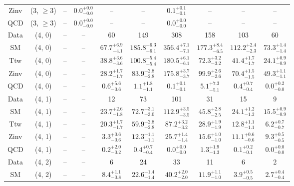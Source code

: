 \begin{table}[h!]
{\begin{tabular}{cccccccccc}
	Zinv & (3, $\ge3$) & -- & $0.0^{+ 0.0 }_{- 0.0 }$ & -- & -- & $0.1^{+ 0.1 }_{- 0.1 }$ & -- & -- & -- \\[0.5ex] 
	QCD & (3, $\ge3$) & -- & $0.0^{+ 0.0 }_{- 0.0 }$ & -- & -- & $0.0^{+ 0.0 }_{- 0.0 }$ & -- & -- & -- \\[0.5ex] 
	Data & (4, 0) & -- & -- & 60 & 149 & 308 & 158 & 103 & 60 \\[0.5ex] 
	SM & (4, 0) & -- & -- & $67.7^{+ 6.9 }_{- 4.1 }$ & $185.8^{+ 6.3 }_{- 6.1 }$ & $356.4^{+ 7.1 }_{- 7.1 }$ & $177.3^{+ 8.4 }_{- 6.5 }$ & $112.2^{+ 2.4 }_{- 2.3 }$ & $73.3^{+ 1.4 }_{- 1.4 }$ \\[0.5ex] 
	Ttw & (4, 0) & -- & -- & $38.8^{+ 3.6 }_{- 3.6 }$ & $100.8^{+ 5.4 }_{- 5.4 }$ & $180.5^{+ 6.1 }_{- 6.1 }$ & $72.3^{+ 3.2 }_{- 3.2 }$ & $41.4^{+ 1.7 }_{- 1.7 }$ & $24.1^{+ 0.9 }_{- 0.9 }$ \\[0.5ex] 
	Zinv & (4, 0) & -- & -- & $28.2^{+ 1.7 }_{- 1.7 }$ & $83.9^{+ 2.8 }_{- 2.8 }$ & $175.8^{+ 3.7 }_{- 3.7 }$ & $99.9^{+ 2.6 }_{- 2.6 }$ & $70.4^{+ 1.5 }_{- 1.5 }$ & $49.3^{+ 1.1 }_{- 1.1 }$ \\[0.5ex] 
	QCD & (4, 0) & -- & -- & $0.6^{+ 5.6 }_{- 0.6 }$ & $1.1^{+ 1.8 }_{- 1.1 }$ & $0.1^{+ 0.1 }_{- 0.1 }$ & $5.1^{+ 7.3 }_{- 5.1 }$ & $0.4^{+ 0.7 }_{- 0.4 }$ & $0.0^{+ 0.2 }_{- 0.0 }$ \\[0.5ex] 
	Data & (4, 1) & -- & -- & 12 & 73 & 101 & 31 & 15 & 9 \\[0.5ex] 
	SM & (4, 1) & -- & -- & $23.7^{+ 2.6 }_{- 1.8 }$ & $72.7^{+ 3.1 }_{- 3.0 }$ & $112.9^{+ 3.5 }_{- 3.5 }$ & $45.8^{+ 2.8 }_{- 2.5 }$ & $24.1^{+ 1.2 }_{- 1.2 }$ & $15.5^{+ 0.9 }_{- 0.9 }$ \\[0.5ex] 
	Ttw & (4, 1) & -- & -- & $20.3^{+ 1.7 }_{- 1.7 }$ & $59.9^{+ 2.8 }_{- 2.8 }$ & $87.2^{+ 3.2 }_{- 3.2 }$ & $28.9^{+ 1.9 }_{- 1.9 }$ & $12.8^{+ 1.1 }_{- 1.1 }$ & $6.2^{+ 0.7 }_{- 0.7 }$ \\[0.5ex] 
	Zinv & (4, 1) & -- & -- & $3.3^{+ 0.6 }_{- 0.6 }$ & $12.3^{+ 1.1 }_{- 1.1 }$ & $25.7^{+ 1.4 }_{- 1.4 }$ & $15.6^{+ 1.0 }_{- 1.0 }$ & $11.1^{+ 0.6 }_{- 0.6 }$ & $9.3^{+ 0.5 }_{- 0.5 }$ \\[0.5ex] 
	QCD & (4, 1) & -- & -- & $0.2^{+ 2.0 }_{- 0.2 }$ & $0.4^{+ 0.7 }_{- 0.4 }$ & $0.0^{+ 0.0 }_{- 0.0 }$ & $1.3^{+ 1.9 }_{- 1.3 }$ & $0.1^{+ 0.2 }_{- 0.1 }$ & $0.0^{+ 0.0 }_{- 0.0 }$ \\[0.5ex] 
	Data & (4, 2) & -- & -- & 6 & 24 & 33 & 11 & 6 & 2 \\[0.5ex] 
	SM & (4, 2) & -- & -- & $8.4^{+ 1.1 }_{- 0.8 }$ & $22.6^{+ 1.4 }_{- 1.4 }$ & $40.2^{+ 2.0 }_{- 2.0 }$ & $11.9^{+ 1.1 }_{- 1.0 }$ & $3.9^{+ 0.5 }_{- 0.5 }$ & $2.7^{+ 0.4 }_{- 0.4 }$ \\[0.5ex] 

\end{tabular}}
\end{table}
